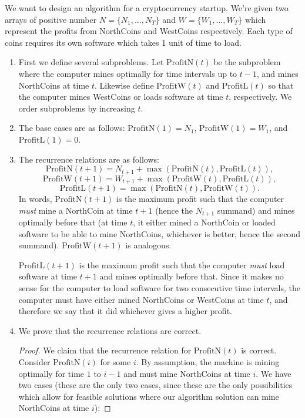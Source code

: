 \documentclass[11pt]{article}
\newcommand{\pn}{\textrm{ProfitN}}
\newcommand{\pw}{\textrm{ProfitW}}
\newcommand{\pl}{\textrm{ProfitL}}
\begin{document}
We want to design an algorithm for a cryptocurrency startup. We're given two arrays of positive number $N=\{N_1, \dots, N_T\}$ and $W=\{W_1, \dots, W_T\}$ which represent the profits from NorthCoins and WestCoins respectively. Each type of coins requires its own software which takes 1 unit of time to load. 
\begin{enumerate}
\item First we define several subproblems. Let $\pn(t)$ be the subproblem where the computer mines optimally for time intervals up to $t-1$, and mines NorthCoins at time $t$. Likewise define $\textrm{ProfitW}(t)$ and $\pl(t)$ so that the computer mines WestCoins or loads software at time $t$, respectively. We order subproblems by increasing $t$.
\item The base cases are as follows: $\pn(1) = N_1$, $\pw(1) = W_1$, and $\pl(1) = 0$. 
\item The recurrence relations are as follows:
\[ \pn(t+1) = N_{t+1} + \max(\pn(t), \pl(t)),\]
\[ \pw(t+1) = W_{t+1} + \max(\pw(t), \pl(t)),\]
\[ \pl(t+1) = \max(\pn(t), \pw(t)).\]
In words, $\pn(t+1)$ is the maximum profit such that the computer \textit{must} mine a NorthCoin at time $t+1$ (hence the $N_{t+1}$ summand) and mines optimally before that (at time $t$, it either mined a NorthCoin or loaded software to be able to mine NorthCoins, whichever is better, hence the second summand). $\pw(t+1)$ is analogous. 

$\pl(t+1)$ is the maximum profit such that the computer \textit{must} load software at time $t+1$ and mines optimally before that. Since it makes no sense for the computer to load software for two consecutive time intervals, the computer must have either mined NorthCoins or WestCoins at time $t$, and therefore we say that it did whichever gives a higher profit. 
\item We prove that the recurrence relations are correct.
\begin{proof} We claim that the recurrence relation for $\pn(t)$ is correct. 
Consider $\pn(i)$ for some $i$. By assumption, the machine is mining optimally for time $1$ to $i-1$ and must mine NorthCoins at time $i$. We have two cases (these are the only two cases, since these are the only possibilities which allow for feasible solutions where our algorithm solution can mine NorthCoins at time $i$):


\end{proof}
\end{enumerate}
\end{document}
